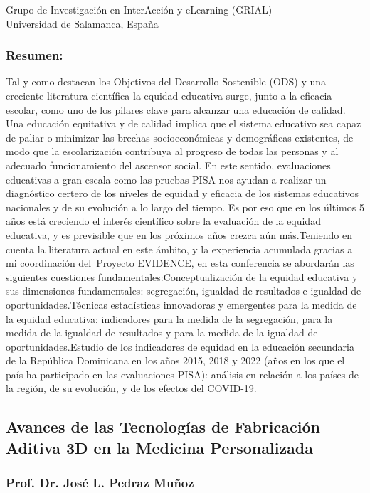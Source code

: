 \documentclass[11pt,a4paper]{article}
\begin{document}
\noindent Grupo de Investigación en InterAcción y eLearning (GRIAL) \\
Universidad de Salamanca, España


\subsubsection*{Resumen:} Tal y como destacan los Objetivos del Desarrollo Sostenible (ODS) y una creciente literatura científica la equidad educativa surge, junto a la eficacia escolar, como uno de los pilares clave para alcanzar una educación de calidad. Una educación equitativa y de calidad implica que el sistema educativo sea capaz de paliar o minimizar las brechas socioeconómicas y demográficas existentes, de modo que la escolarización contribuya al progreso de todas las personas y al adecuado funcionamiento del ascensor social. En este sentido, evaluaciones educativas a gran escala como las pruebas PISA nos ayudan a realizar un diagnóstico certero de los niveles de equidad y eficacia de los sistemas educativos nacionales y de su evolución a lo largo del tiempo. Es por eso que en los últimos 5 años está creciendo el interés científico sobre la evaluación de la equidad educativa, y es previsible que en los próximos años crezca aún más.Teniendo en cuenta la literatura actual en este ámbito, y la experiencia acumulada gracias a mi coordinación del Proyecto EVIDENCE, en esta conferencia se abordarán las siguientes cuestiones fundamentales:Conceptualización de la equidad educativa y sus dimensiones fundamentales: segregación, igualdad de resultados e igualdad de oportunidades.Técnicas estadísticas innovadoras y emergentes para la medida de la equidad educativa: indicadores para la medida de la segregación, para la medida de la igualdad de resultados y para la medida de la igualdad de oportunidades.Estudio de los indicadores de equidad en la educación secundaria de la República Dominicana en los años 2015, 2018 y 2022 (años en los que el país ha participado en las evaluaciones PISA): análisis en relación a los países de la región, de su evolución, y de los efectos del COVID-19.


\subsection{Avances de las Tecnologías de Fabricación Aditiva 3D en la Medicina Personalizada}

\subsubsection*{Prof. Dr. José L. Pedraz Muñoz}
\end{document}
